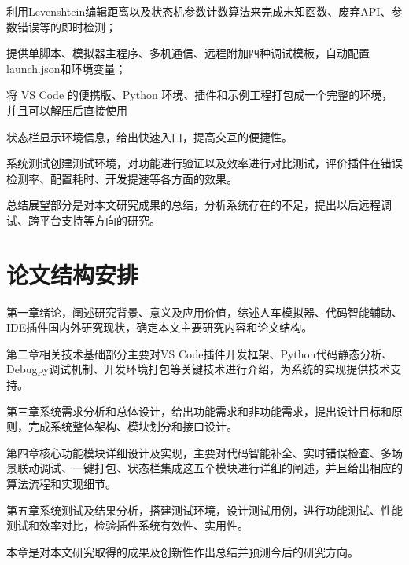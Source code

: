 利用Levenshtein编辑距离以及状态机参数计数算法来完成未知函数、废弃API、参数错误等的即时检测；

提供单脚本、模拟器主程序、多机通信、远程附加四种调试模板，自动配置launch.json和环境变量；

将 VS Code 的便携版、Python
环境、插件和示例工程打包成一个完整的环境，并且可以解压后直接使用

状态栏显示环境信息，给出快速入口，提高交互的便捷性。

系统测试创建测试环境，对功能进行验证以及效率进行对比测试，评价插件在错误检测率、配置耗时、开发提速等各方面的效果。

总结展望部分是对本文研究成果的总结，分析系统存在的不足，提出以后远程调试、跨平台支持等方向的研究。

\section{论文结构安排}

第一章绪论，阐述研究背景、意义及应用价值，综述人车模拟器、代码智能辅助、IDE插件国内外研究现状，确定本文主要研究内容和论文结构。

第二章相关技术基础部分主要对VS Code插件开发框架、Python代码静态分析、Debugpy调试机制、开发环境打包等关键技术进行介绍，为系统的实现提供技术支持。

第三章系统需求分析和总体设计，给出功能需求和非功能需求，提出设计目标和原则，完成系统整体架构、模块划分和接口设计。

第四章核心功能模块详细设计及实现，主要对代码智能补全、实时错误检查、多场景联动调试、一键打包、状态栏集成这五个模块进行详细的阐述，并且给出相应的算法流程和实现细节。

第五章系统测试及结果分析，搭建测试环境，设计测试用例，进行功能测试、性能测试和效率对比，检验插件系统有效性、实用性。

本章是对本文研究取得的成果及创新性作出总结并预测今后的研究方向。
